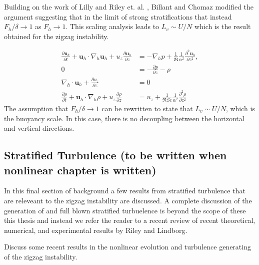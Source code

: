 Building on the work of Lilly \cite{lilly1983} and Riley et. al. \cite{rileylelong2000}, Billant and Chomaz \cite{bc2001} modified the argument suggesting that in the limit of strong stratifications that instead $F_{h}/\delta\rightarrow 1$ as $F_{h}\rightarrow 1$. This scaling analysis leads to $L_{v} \sim U/N$ which is the result obtained for the zigzag instability.

\begin{align}
\frac{\partial \textbf{u}_{h}}{\partial t} + \textbf{u}_{h}\cdot\nabla_{h}\textbf{u}_{h}+u_{z}\frac{\partial \textbf{u}_{h}}{\partial z} &= -\nabla_{h}p + \frac{1}{\Re}\frac{1}{\alpha^{2}}\frac{\partial^{2}\textbf{u}_{h}}{\partial z^{2}},\\
0&= -\frac{\partial p}{\partial z} - \rho  \\
\nabla_{h}\cdot\textbf{u}_{h}+ \frac{\partial u_{z}}{\partial z} &=0\\
\frac{\partial \rho}{\partial t} + \textbf{u}_{h}\cdot\nabla_{h}\rho + u_{z}\frac{\partial \rho}{\partial z} &= u_{z} + \frac{1}{\Re Sc}\frac{1}{\alpha^{2}}\frac{\partial^{2}\rho}{\partial z^{2}} 
\end{align} 
The assumption that $F_{h}/\delta \rightarrow 1$ can be rewritten to state that $L_{v} \sim U/N$, which is the buoyancy scale. In this case, there is no decoupling between the horizontal and vertical directions.  

\subsection{Stratified Turbulence (to be written when nonlinear chapter is written)}
In this final section of background a few results from stratified turbulence that are releveant to the zigzag instability are discussed. A complete discussion of the generation of and full blown stratified turbuelence is beyond the scope of these this thesis and instead we refer the reader to a recent review of recent theoretical, numerical, and experimental results by Riley and Lindborg. 

Discuss some recent results in the nonlinear evolution and turbulence generating of the zigzag instability. 



